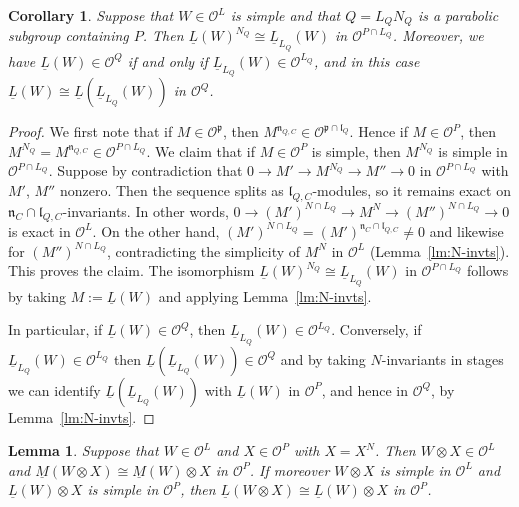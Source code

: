 \documentclass[a4paper]{amsart}
\numberwithin{equation}{section}
\newtheorem{lem}[thm]{Lemma}
\newtheorem{cor}[thm]{Corollary}
\theoremstyle{remark}
\theoremstyle{definition}
\begin{document}
\begin{cor}\label{cor:N-invts}
  Suppose that $W \in \mathcal{O}^{L}$ is simple and that $Q = L_{Q}N_{Q}$ is a parabolic subgroup containing $P$.
  Then $\underline{L}(W)^{N_Q} \cong \underline{L}_{L_Q}(W)$ in $\mathcal{O}^{P \cap L_Q}$.
  Moreover, we have $\underline{L}(W) \in \mathcal{O}^{Q}$ if and only if $\underline{L}_{L_Q}(W) \in \mathcal{O}^{L_Q}$, and in this case $\underline L(W) \cong \underline L(\underline{L}_{L_Q}(W))$ in $\mathcal{O}^{Q}$.
\end{cor}

\begin{proof}
  We first note that if $M \in \mathcal O^{\mathfrak p}$, then $M^{\mathfrak n_{Q,C}} \in \mathcal O^{\mathfrak p \cap \mathfrak l_Q}$.   Hence if $M \in \mathcal O^P$, then $M^{N_Q} = M^{\mathfrak n_{Q,C}} \in \mathcal O^{P \cap L_Q}$.
  We claim that if $M \in \mathcal O^P$ is simple, then $M^{N_Q}$ is simple in $\mathcal O^{P \cap L_Q}$.   Suppose by contradiction that $0 \to M' \to M^{N_Q} \to M'' \to 0$ in $\mathcal O^{P \cap L_Q}$ with $M'$, $M''$ nonzero.
  Then the sequence splits as $\mathfrak l_{Q,C}$-modules, so it remains exact on $\mathfrak n_C \cap \mathfrak l_{Q,C}$-invariants.
  In other words, $0 \to (M')^{N \cap L_Q} \to M^N \to (M'')^{N \cap L_Q} \to 0$ is exact in $\mathcal O^L$.
  On the other hand, $(M')^{N \cap L_Q} = (M')^{\mathfrak n_C \cap \mathfrak l_{Q,C}} \ne 0$ and likewise for $(M'')^{N \cap L_Q}$, contradicting the simplicity of $M^N$ in $\mathcal O^L$ (Lemma~\ref{lm:N-invts}).
  This proves the claim.
  The isomorphism $\underline{L}(W)^{N_Q} \cong \underline{L}_{L_Q}(W)$ in $\mathcal{O}^{P \cap L_Q}$ follows by taking $M := \underline L(W)$ and applying Lemma~\ref{lm:N-invts}.

  In particular, if $\underline{L}(W) \in \mathcal{O}^{Q}$, then $\underline{L}_{L_Q}(W) \in \mathcal{O}^{L_Q}$.   Conversely, if $\underline{L}_{L_Q}(W) \in \mathcal{O}^{L_Q}$ then $\underline L(\underline{L}_{L_Q}(W)) \in \mathcal{O}^{Q}$ and by taking $N$-invariants in stages we can identify $\underline L(\underline{L}_{L_Q}(W))$ with $\underline L(W)$ in $\mathcal{O}^{P}$, and hence in $\mathcal{O}^{Q}$, by Lemma~\ref{lm:N-invts}.
\end{proof}

\begin{lem}\label{lem:verma-tensor}
  Suppose that $W \in \mathcal{O}^{L}$ and $X \in \mathcal{O}^{P}$ with $X = X^N$.
  Then $W \otimes X \in \mathcal{O}^{L}$ and $\underline{M}(W \otimes X) \cong \underline{M}(W) \otimes X$ in $\mathcal{O}^{P}$.
  If moreover $W \otimes X$ is simple in $\mathcal O^L$ and $\underline L(W)\otimes X$ is simple in $\mathcal O^P$, then $\underline{L}(W \otimes X) \cong \underline{L}(W) \otimes X$ in $\mathcal{O}^{P}$.
\end{lem}
\end{document}
